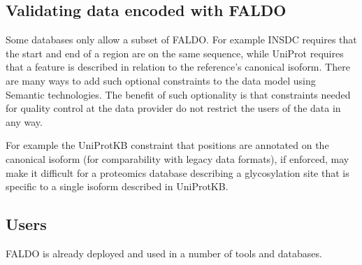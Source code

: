 \subsection*{Validating data encoded with FALDO}

Some databases only allow a subset of FALDO. For example
INSDC requires that the start and end of a region are on the same sequence,
while UniProt requires that a feature is described in relation to the reference's canonical isoform.
There are many ways to add such optional constraints to the data model using Semantic technologies\cite{RDFValidationReport}.
The benefit of such optionality is that constraints needed for quality control at
the data provider do not restrict the users of the data in any way.

For example the UniProtKB constraint that positions are annotated on the canonical isoform
(for comparability with legacy data formats), if enforced, may make it difficult for a proteomics
database describing a glycosylation site that is specific to a single isoform described in UniProtKB.

\subsection*{Users}
FALDO is already deployed and used in a number of tools and databases.

